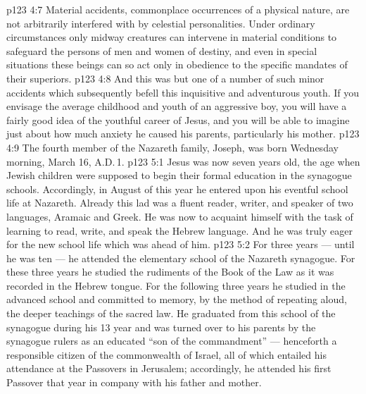 \vs p123 4:7 Material accidents, commonplace occurrences of a physical nature, are not arbitrarily interfered with by celestial personalities. Under ordinary circumstances only midway creatures can intervene in material conditions to safeguard the persons of men and women of destiny, and even in special situations these beings can so act only in obedience to the specific mandates of their superiors.
\vs p123 4:8 And this was but one of a number of such minor accidents which subsequently befell this inquisitive and adventurous youth. If you envisage the average childhood and youth of an aggressive boy, you will have a fairly good idea of the youthful career of Jesus, and you will be able to imagine just about how much anxiety he caused his parents, particularly his mother.
\vs p123 4:9 \pc The fourth member of the Nazareth family, Joseph, was born Wednesday morning, March 16, A.D.\,1.
\vs p123 5:1 Jesus was now seven years old, the age when Jewish children were supposed to begin their formal education in the synagogue schools. Accordingly, in August of this year he entered upon his eventful school life at Nazareth. Already this lad was a fluent reader, writer, and speaker of two languages, Aramaic and Greek. He was now to acquaint himself with the task of learning to read, write, and speak the Hebrew language. And he was truly eager for the new school life which was ahead of him.
\vs p123 5:2 For three years --- until he was ten --- he attended the elementary school of the Nazareth synagogue. For these three years he studied the rudiments of the Book of the Law as it was recorded in the Hebrew tongue. For the following three years he studied in the advanced school and committed to memory, by the method of repeating aloud, the deeper teachings of the sacred law. He graduated from this school of the synagogue during his 13 year and was turned over to his parents by the synagogue rulers as an educated “son of the commandment” --- henceforth a responsible citizen of the commonwealth of Israel, all of which entailed his attendance at the Passovers in Jerusalem; accordingly, he attended his first Passover that year in company with his father and mother.
